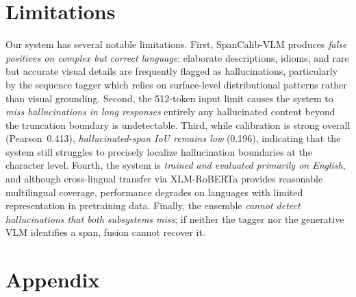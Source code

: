 \documentclass[11pt]{article}
\begin{document}
\newpage
\section{Limitations}
Our system has several notable limitations. First, SpanCalib-VLM produces \emph{false positives on complex but correct language}: elaborate descriptions, idioms, and rare but accurate visual details are frequently flagged as hallucinations, particularly by the sequence tagger which relies on surface-level distributional patterns rather than visual grounding. Second, the 512-token input limit causes the system to \emph{miss hallucinations in long responses} entirely any hallucinated content beyond the truncation boundary is undetectable. Third, while calibration is strong overall (Pearson~0.413), \emph{hallucinated-span IoU remains low} (0.196), indicating that the system still struggles to precisely localize hallucination boundaries at the character level. Fourth, the system is \emph{trained and evaluated primarily on English}, and although cross-lingual transfer via XLM-RoBERTa provides reasonable multilingual coverage, performance degrades on languages with limited representation in pretraining data. Finally, the ensemble \emph{cannot detect hallucinations that both subsystems miss}; if neither the tagger nor the generative VLM identifies a span, fusion cannot recover it.


% 




\onecolumn
\appendix
\section{Appendix}
\end{document}
